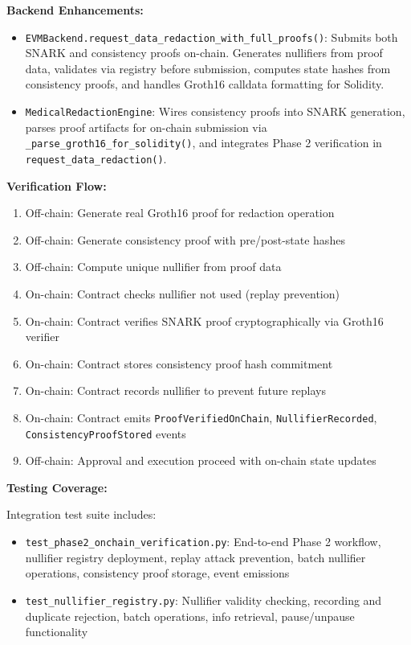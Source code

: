 \textbf{Backend Enhancements:}
\begin{itemize}
    \item \texttt{EVMBackend.request\_data\_redaction\_with\_full\_proofs()}: Submits both SNARK and consistency proofs on-chain. Generates nullifiers from proof data, validates via registry before submission, computes state hashes from consistency proofs, and handles Groth16 calldata formatting for Solidity.
    \item \texttt{MedicalRedactionEngine}: Wires consistency proofs into SNARK generation, parses proof artifacts for on-chain submission via \texttt{\_parse\_groth16\_for\_solidity()}, and integrates Phase 2 verification in \texttt{request\_data\_redaction()}.
\end{itemize}

\textbf{Verification Flow:}
\begin{enumerate}
    \item Off-chain: Generate real Groth16 proof for redaction operation
    \item Off-chain: Generate consistency proof with pre/post-state hashes
    \item Off-chain: Compute unique nullifier from proof data
    \item On-chain: Contract checks nullifier not used (replay prevention)
    \item On-chain: Contract verifies SNARK proof cryptographically via Groth16 verifier
    \item On-chain: Contract stores consistency proof hash commitment
    \item On-chain: Contract records nullifier to prevent future replays
    \item On-chain: Contract emits \texttt{ProofVerifiedOnChain}, \texttt{NullifierRecorded}, \texttt{ConsistencyProofStored} events
    \item Off-chain: Approval and execution proceed with on-chain state updates
\end{enumerate}

\textbf{Testing Coverage:}

Integration test suite includes:
\begin{itemize}
    \item \texttt{test\_phase2\_onchain\_verification.py}: End-to-end Phase 2 workflow, nullifier registry deployment, replay attack prevention, batch nullifier operations, consistency proof storage, event emissions
    \item \texttt{test\_nullifier\_registry.py}: Nullifier validity checking, recording and duplicate rejection, batch operations, info retrieval, pause/unpause functionality
\end{itemize}

